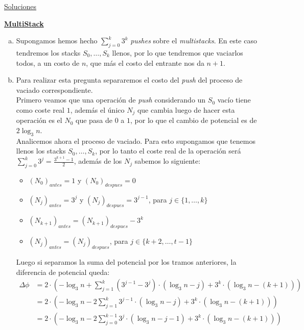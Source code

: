 \documentclass[dcc,uchile]{fcfmcourse}
\theoremstyle{plain}
\theoremstyle{definition}
\begin{document}
\newpage
\begin{center}
{\huge \underline{Soluciones}}
\end{center}
\begin{problems}
\problem \underline{\textbf{MultiStack}}\\
\begin{enumerate}[a)]
    \item Supongamos hemos hecho $\sum_{j=0}^{k}3^{k}$ \textit{pushes} sobre el \textit{multistacks}. En este caso tendremos los stacks $S_{0}, \ldots, S_{k}$ llenos, por lo que tendremos que vaciarlos todos, a un costo de $n$, que más el costo del  entrante nos da $n+1$.
    \item Para realizar esta pregunta separaremos el costo del \textit{push} del proceso de vaciado correspondiente.\\
    Primero veamos que una operación de \textit{push} considerando un $S_{0}$ vacío tiene como coste real $1$, además el único $N_{j}$ que cambia luego de hacer esta operación es el $N_{0}$ que pasa de $0$ a $1$, por lo que el cambio de potencial es de $2\log_3{n}$.\\
    Analicemos ahora el proceso de vaciado. Para esto supongamos que tenemos llenos los stacks $S_{0}, \ldots, S_{k}$, por lo tanto el coste real de la operación será $\sum_{j = 0}^{k} 3^{j} = \frac{3^{k+1}-1}{2}$, además de los $N_{j}$ sabemos lo siguiente:
    \begin{itemize}
        \item $(N_{0})_{antes} = 1$ y $(N_{0})_{despues} = 0$
        \item $(N_{j})_{antes} = 3^j$ y $(N_{j})_{despues} = 3^{j-1}$, para $j \in \{1, \ldots, k\}$
        \item $(N_{k+1})_{antes} = (N_{k+1})_{despues} - 3^k$
        \item $(N_{j})_{antes} = (N_{j})_{despues}$, para $j \in \{k+2, \ldots, t-1\}$
    \end{itemize}
    Luego si separamos la suma del potencial por los tramos anteriores, la diferencia de potencial queda:
    \begin{align*}
        \Delta \phi &=  2\cdot \left( -\log_3{n} + \sum_{j=1}^{k} (3^{j-1}-3^j) \cdot (\log_3{n} − j) + 3^{k}\cdot (\log_3{n} − (k+1)) \right)\\
        &=  2\cdot \left( -\log_3{n} - 2\sum_{j=1}^{k} 3^{j-1} \cdot (\log_3{n} − j) + 3^{k}\cdot (\log_3{n} − (k+1)) \right)\\
        &=  2\cdot \left( -\log_3{n} - 2\sum_{j=0}^{k-1} 3^{j} \cdot (\log_3{n} − j - 1) + 3^{k}\cdot (\log_3{n} − (k+1)) \right)

\end{align*}
\end{enumerate}
\end{problems}
\end{document}
